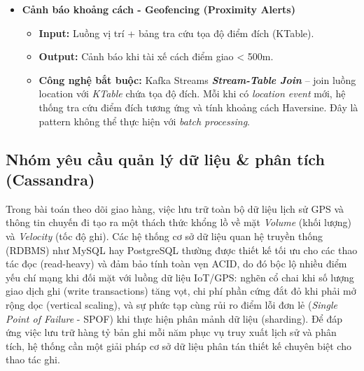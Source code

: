 \begin{itemize}
    \item \textbf{Cảnh báo khoảng cách - Geofencing (Proximity Alerts)}
    \begin{itemize}
        \item \textbf{Input:} Luồng vị trí + bảng tra cứu tọa độ điểm đích (KTable).
        \item \textbf{Output:} Cảnh báo khi tài xế cách điểm giao < 500m.
        \item \textbf{Công nghệ bắt buộc:} Kafka Streams \textbf{\textit{Stream-Table Join}} -- join luồng location với \textit{KTable} chứa tọa độ đích. Mỗi khi có \textit{location event} mới, hệ thống tra cứu điểm đích tương ứng và tính khoảng cách Haversine. Đây là pattern không thể thực hiện với \textit{batch processing}.
    \end{itemize}

\end{itemize}

\subsection{Nhóm yêu cầu quản lý dữ liệu \& phân tích (Cassandra)}
\label{sec:analytics-requirements}

Trong bài toán theo dõi giao hàng, việc lưu trữ toàn bộ dữ liệu lịch sử GPS và thông tin chuyến đi tạo ra một thách thức khổng lồ về mặt \textit{Volume} (khối lượng) và \textit{Velocity} (tốc độ ghi). Các hệ thống cơ sở dữ liệu quan hệ truyền thống (RDBMS) như MySQL hay PostgreSQL thường được thiết kế tối ưu cho các thao tác đọc (read-heavy) và đảm bảo tính toàn vẹn ACID, do đó bộc lộ nhiều điểm yếu chí mạng khi đối mặt với luồng dữ liệu IoT/GPS: nghẽn cổ chai khi số lượng giao dịch ghi (write transactions) tăng vọt, chi phí phần cứng đắt đỏ khi phải mở rộng dọc (vertical scaling), và sự phức tạp cùng rủi ro điểm lỗi đơn lẻ (\textit{Single Point of Failure} - SPOF) khi thực hiện phân mảnh dữ liệu (sharding). Để đáp ứng việc lưu trữ hàng tỷ bản ghi mỗi năm phục vụ truy xuất lịch sử và phân tích, hệ thống cần một giải pháp cơ sở dữ liệu phân tán thiết kế chuyên biệt cho thao tác ghi.


